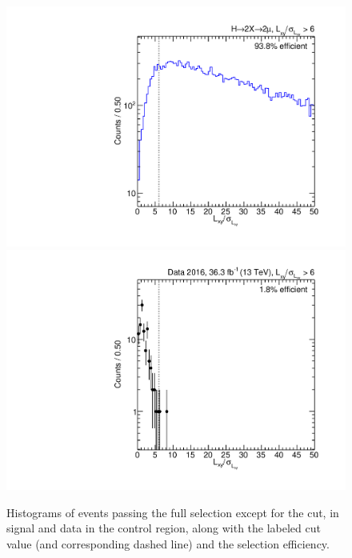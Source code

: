 \begin{figure}[p]
  \centering
  \includegraphics[width=\DSquareWidth]{figures/displaced/NM1_2Mu2J_LxySig.pdf}
  \hspace*{-2em}
  \includegraphics[width=\DSquareWidth]{figures/displaced/NM1_Data_LxySig.pdf}
  \caption[Histograms of events passing the full selection except for the \LxySig cut in \twoMu signal and data.]{Histograms of events passing the full selection except for the \LxySig cut, in  \twoMu signal and  data in the control region, along with the labeled cut value (and corresponding dashed line) and the selection efficiency.}
  \label{fig:dd:NM1_LxySig}
\end{figure}


